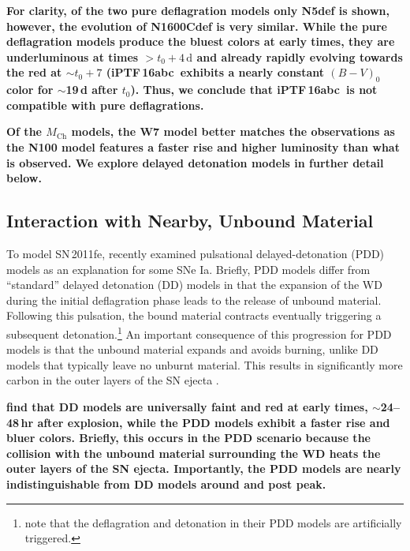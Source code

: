 \documentclass[twocolumn]{aastex61}
\newcommand{\abc}{iPTF\,16abc}
\begin{document}
\textbf{For clarity, of the two pure deflagration models only N5def is shown,
however, the evolution of N1600Cdef is very similar. While the pure
deflagration models produce the bluest colors at early times, they are
underluminous at times $> t_0 + 4\,\mathrm{d}$ and already rapidly evolving
towards the red at $\sim$$t_0 + 7$ (\abc\ exhibits a nearly constant $(B-V)_0$
color for $\sim$19\,d after $t_0$). Thus, we conclude that \abc\ is not
compatible with pure deflagrations.}

\textbf{Of the $M_\textrm{Ch}$ models, the W7 model better matches the
observations as the N100 model features a faster rise and higher luminosity
than what is observed. We explore delayed detonation models in further detail
below.}

\subsection{Interaction with \textbf{Nearby, Unbound} Material}

To model SN\,2011fe, \citet{2014MNRAS.441..532D} recently examined
pulsational delayed-detonation (PDD) models as an explanation for some SNe
Ia. Briefly, PDD models differ from ``standard'' delayed detonation (DD)
models in that the expansion of the WD during the initial deflagration
phase leads to the release of unbound material. Following this pulsation,
the bound material contracts eventually triggering a subsequent
detonation.\footnote{\citet{2014MNRAS.441..532D} note that the deflagration
and detonation in their PDD models are artificially triggered.} An
important consequence of this progression for PDD models is that the
unbound material expands and avoids burning, unlike DD models that
typically leave no unburnt material. This results in significantly more
carbon in the outer layers of the SN ejecta \citep{2014MNRAS.441..532D}.

\textbf{\citet{2014MNRAS.441..532D} find that DD models are universally faint and red at early times, $\sim$24--48\,hr after explosion, while the PDD models exhibit a faster rise and bluer colors. Briefly, this occurs in the PDD scenario because the collision with the unbound material surrounding the WD heats the outer layers of the SN ejecta. Importantly, the PDD models are nearly indistinguishable from DD models around and post peak.}
\end{document}
